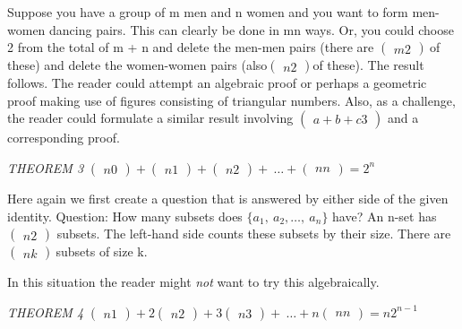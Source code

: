 \documentclass[10pt,letter]{article}
\begin{document}
Suppose you have a group of m men and n women and you want to form
men-women dancing pairs. This can clearly be done in mn ways. Or, you
could choose 2 from the total of m + n and delete the men-men pairs
(there are \(\begin{pmatrix}
m
2
\end{pmatrix}
\ \)of these) and delete the women-women pairs
(also\(\begin{pmatrix}
n
2
\end{pmatrix}
\)of these). The result follows. The reader could attempt
an algebraic proof or perhaps a geometric proof making use of figures
consisting of triangular numbers. Also, as a challenge, the reader could
formulate a similar result involving \(\begin{pmatrix}
a + b + c
3
\end{pmatrix}
\) and a corresponding proof.

\emph{THEOREM 3} \(\begin{pmatrix}
n
0
\end{pmatrix}
 +
\begin{pmatrix}
n
1
\end{pmatrix}
 +
\begin{pmatrix}
n
2
\end{pmatrix}
 + \ \ldots +
\begin{pmatrix}
n
n
\end{pmatrix}
 = 2^{n}\)

Here again we first create a question that is answered by either side of
the given identity. Question: How many subsets does
\(\{ a_{1},\ a_{2},\ldots,\ a_{n}\}\) have? An n-set has
\(\begin{pmatrix}
n
2
\end{pmatrix}
\) subsets. The left-hand side counts these subsets by
their size. There are \(\begin{pmatrix}
n
k
\end{pmatrix}
\ \)subsets of size k.

In this situation the reader might \emph{not} want to try this
algebraically.

\emph{THEOREM 4} \(\begin{pmatrix}
n
1
\end{pmatrix}
 + 2
\begin{pmatrix}
n
2
\end{pmatrix}
 + 3
\begin{pmatrix}
n
3
\end{pmatrix}
 + \ \ldots + n
\begin{pmatrix}
n
n
\end{pmatrix}
 = {n2}^{n - 1}\)
\end{document}
